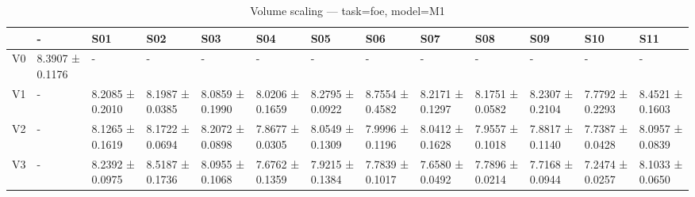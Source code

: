 \begin{table}[htbp]
\centering
\caption{Volume scaling — task=foe, model=M1}
\label{tab:volume:foe:M1}
\begin{tabular}{lllllllllllll}
\toprule
\toprule
 & - & S01 & S02 & S03 & S04 & S05 & S06 & S07 & S08 & S09 & S10 & S11 \\
\midrule
\midrule
V0 & 8.3907 ± 0.1176 & - & - & - & - & - & - & - & - & - & - & - \\
V1 & - & 8.2085 ± 0.2010 & 8.1987 ± 0.0385 & 8.0859 ± 0.1990 & 8.0206 ± 0.1659 & 8.2795 ± 0.0922 & 8.7554 ± 0.4582 & 8.2171 ± 0.1297 & 8.1751 ± 0.0582 & 8.2307 ± 0.2104 & 7.7792 ± 0.2293 & 8.4521 ± 0.1603 \\
V2 & - & 8.1265 ± 0.1619 & 8.1722 ± 0.0694 & 8.2072 ± 0.0898 & 7.8677 ± 0.0305 & 8.0549 ± 0.1309 & 7.9996 ± 0.1196 & 8.0412 ± 0.1628 & 7.9557 ± 0.1018 & 7.8817 ± 0.1140 & 7.7387 ± 0.0428 & 8.0957 ± 0.0839 \\
V3 & - & 8.2392 ± 0.0975 & 8.5187 ± 0.1736 & 8.0955 ± 0.1068 & 7.6762 ± 0.1359 & 7.9215 ± 0.1384 & 7.7839 ± 0.1017 & 7.6580 ± 0.0492 & 7.7896 ± 0.0214 & 7.7168 ± 0.0944 & 7.2474 ± 0.0257 & 8.1033 ± 0.0650 \\
\bottomrule
\end{tabular}\end{table}
